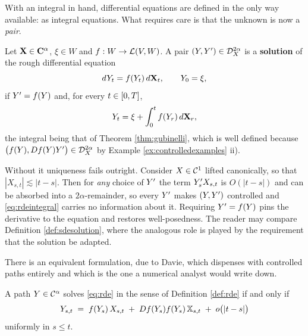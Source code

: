 With an integral in hand, differential equations are defined in the only way available: as integral
equations. What requires care is that the unknown is now a \emph{pair}.

\begin{definition}\label{def:rde}
Let $\mathbf{X} \in \mathbf{C}^{\alpha}$, $\xi \in W$ and $f : W \to \mathcal{L}\!\left(V,W\right)$. A pair
$(Y,Y') \in \mathcal{D}^{2\alpha}_{X}$ is a \textbf{solution} of the rough differential equation
\begin{equation}\label{eq:rde}
d Y_t = f(Y_t)\,d\mathbf{X}_t, \qquad Y_0 = \xi,
\end{equation}
if $\Gub = f(Y)$ and, for every $t \in [0,T]$,
\begin{equation}\label{eq:rdeintegral}
Y_t = \xi + \int_0^t f(Y_r)\,d\mathbf{X}_r ,
\end{equation}
the integral being that of Theorem \ref{thm:gubinelli}, which is well defined because
$\bigl(f(Y), Df(Y)Y'\bigr) \in \mathcal{D}^{2\alpha}_{X}$ by Example \ref{ex:controlledexamples} ii).
\end{definition}

\begin{remark}[Why $\Gub = f(Y)$ is imposed]\label{rem:whygubisf}
Without it uniqueness fails outright. Consider $X\in\mathcal{C}^{1}$
lifted canonically, so that $|X_{s,t}| \lesssim |t-s|$. Then for \emph{any} choice of $Y'$ the
term $Y'_s X_{s,t}$ is $O(|t-s|)$ and can be absorbed into a $2\alpha$-remainder, so every $Y'$
makes $(Y,Y')$ controlled and \eqref{eq:rdeintegral} carries no information about it. Requiring
$\Gub = f(Y)$ pins the derivative to the equation and restores well-posedness. The reader may
compare Definition \ref{def:sdesolution}, where the analogous role is played by the requirement
that the solution be adapted.
\end{remark}

There is an equivalent formulation, due to Davie, which dispenses with controlled paths entirely
and which is the one a numerical analyst would write down.

\begin{proposition}\label{prop:davie}
A path $Y \in \mathcal{C}^{\alpha}$ solves \eqref{eq:rde} in the sense of Definition \ref{def:rde} if and
only if
\begin{equation}\label{eq:davie}
Y_{s,t} \;=\; f(Y_s)\,X_{s,t} \;+\; Df(Y_s)f(Y_s)\,\mathbb{X}_{s,t} \;+\; o\bigl(|t-s|\bigr)
\end{equation}
uniformly in $s\leq t$. \qedopentext
\end{proposition}

